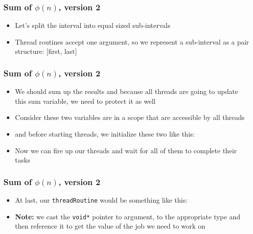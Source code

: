 \documentclass[aspectratio=43,11pt]{beamer}
\begin{document}
\begin{frame}
  \frametitle{Sum of $\phi(n)$, version 2}
  
  \begin{itemize}
    \item Let's split the interval into equal sized sub-intervals
    \item Thread routines accept one argument, so we represent a sub-interval as a
    pair structure: [first, last]
  \end{itemize}
  
  
\end{frame}
\begin{frame}
  \frametitle{Sum of $\phi(n)$, version 2}
  
  \begin{itemize}
    \item We should sum up the results and because all threads are going to update this
    sum variable, we need to protect it as well
    \item Consider these two variables are in a scope that are accessible by all threads
    
    \item and before starting threads, we initialize these two like this:
    
    \item Now we can fire up our threads and wait for all of them to complete their tasks
    
  \end{itemize}
\end{frame}
\begin{frame}
  \frametitle{Sum of $\phi(n)$, version 2}
  
  \begin{itemize}
    \item At last, our {\tt threadRoutine} would be something like this:
    
    \item \textbf{Note:} we cast the {\tt void*} pointer to argument, to the appropriate
    type and then reference it to get the value of the job we need to work on
  \end{itemize}
  
  \let\thefootnote\relax{}
\end{frame}
\end{document}
